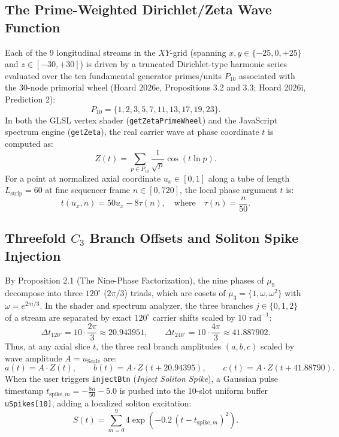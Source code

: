 \documentclass[11pt, a4paper]{article}
\begin{document}
\subsection{The Prime-Weighted Dirichlet/Zeta Wave Function}
Each of the 9 longitudinal streams in the $XY$-grid (spanning $x, y \in \{-25, 0, +25\}$ and $z \in [-30, +30]$) is driven by a truncated Dirichlet-type harmonic series evaluated over the ten fundamental generator primes/units $P_{10}$ associated with the 30-node primorial wheel (Hoard 2026e, Propositions 3.2 and 3.3; Hoard 2026i, Prediction 2):
\begin{equation}
P_{10} = \{1, 2, 3, 5, 7, 11, 13, 17, 19, 23\}.
\end{equation}
In both the GLSL vertex shader (\texttt{getZetaPrimeWheel}) and the JavaScript spectrum engine (\texttt{getZeta}), the real carrier wave at phase coordinate $t$ is computed as:
\begin{equation}
Z(t) = \sum_{p \in P_{10}} \frac{1}{\sqrt{p}} \cos(t \ln p).
\label{eq:zeta-wave}
\end{equation}
For a point at normalized axial coordinate $u_x \in [0, 1]$ along a tube of length $L_{\text{strip}} = 60$ at fine sequencer frame $n \in [0, 720]$, the local phase argument $t$ is:
\begin{equation}
t(u_x, n) = 50 u_x - 8\tau(n), \quad \text{where} \quad \tau(n) = \frac{n}{50}.
\end{equation}

\subsection{Threefold \texorpdfstring{$C_3$}{C3} Branch Offsets and Soliton Spike Injection}
By Proposition 2.1 (The Nine-Phase Factorization), the nine phases of $\mu_9$ decompose into three $120^\circ$ ($2\pi/3$) triads, which are cosets of $\mu_3 = \{1, \omega, \omega^2\}$ with $\omega = e^{2\pi i/3}$. In the shader and spectrum analyzer, the three branches $j \in \{0, 1, 2\}$ of a stream are separated by exact $120^\circ$ carrier shifts scaled by $10\text{ rad}^{-1}$:
\begin{equation}
\Delta t_{120^\circ} = 10 \cdot \frac{2\pi}{3} \approx 20.943951, \qquad \Delta t_{240^\circ} = 10 \cdot \frac{4\pi}{3} \approx 41.887902.
\end{equation}
Thus, at any axial slice $t$, the three real branch amplitudes $(a, b, c)$ scaled by wave amplitude $A = u_{\text{Scale}}$ are:
\begin{equation}
a(t) = A \cdot Z(t), \qquad b(t) = A \cdot Z(t + 20.94395), \qquad c(t) = A \cdot Z(t + 41.88790).
\label{eq:three-branches}
\end{equation}
When the user triggers \texttt{injectBtn} (\textit{Inject Soliton Spike}), a Gaussian pulse timestamp $t_{\text{spike},m} = -\frac{8n}{50} - 5.0$ is pushed into the 10-slot uniform buffer \texttt{uSpikes[10]}, adding a localized soliton excitation:
\begin{equation}
S(t) = \sum_{m=0}^{9} 4 \exp\!\left(-0.2\,(t - t_{\text{spike},m})^2\right).
\end{equation}
\end{document}
